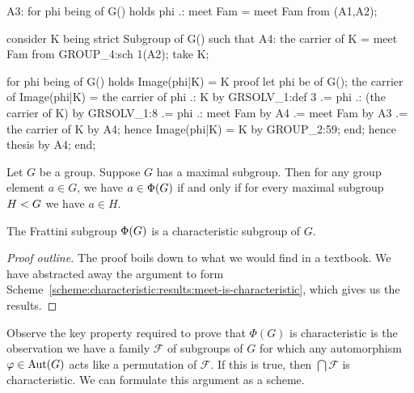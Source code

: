   A3: for phi being  of G()
  holds phi .: meet Fam = meet Fam from (A1,A2);

  consider K being strict Subgroup of G() such that
  A4: the carrier of K = meet Fam
  from GROUP_4:sch 1(A2);
  take K;

  for phi being  of G()
  holds Image(phi|K) = K
  proof
    let phi be  of G();
    the carrier of Image(phi|K)
     = the carrier of phi .: K by GRSOLV_1:def 3
    .= phi .: (the carrier of K) by GRSOLV_1:8
    .= phi .: meet Fam by A4
    .= meet Fam by A3
    .= the carrier of K by A4;
    hence Image(phi|K) = K by GROUP_2:59;
  end;
  hence thesis by A4;
end;
\eatline
{}\nwendcode{}\nwdocspar
\begin{proposition}
  Let $G$ be a group. Suppose $G$ has a maximal subgroup.
  Then for any group element $a\in G$, we have
  $a\in\operatorname{\Phi}(G)$ if and only if for every maximal subgroup
  $H< G$ we have $a\in H$.
\end{proposition}

\begin{theorem}
The Frattini subgroup $\operatorname{\Phi}(G)$ is a characteristic subgroup of $G$.
\end{theorem}

\begin{proof}[Proof outline]
The proof boils down to what we would find in a textbook.
We have abstracted away the argument to form Scheme~\ref{scheme:characteristic:results:meet-is-characteristic},
which gives us the results.
\end{proof}

\begin{thm-remark}
Observe the key property required to prove that $\Phi(G)$ is
characteristic is the observation we have a family $\mathcal{F}$ of
subgroups of $G$ for which any automorphism $\varphi\in\operatorname{Aut}(G)$ acts
like a permutation of $\mathcal{F}$. If this is true, then
$\bigcap\mathcal{F}$ is characteristic. We can formulate this argument
as a scheme.
\end{thm-remark}

